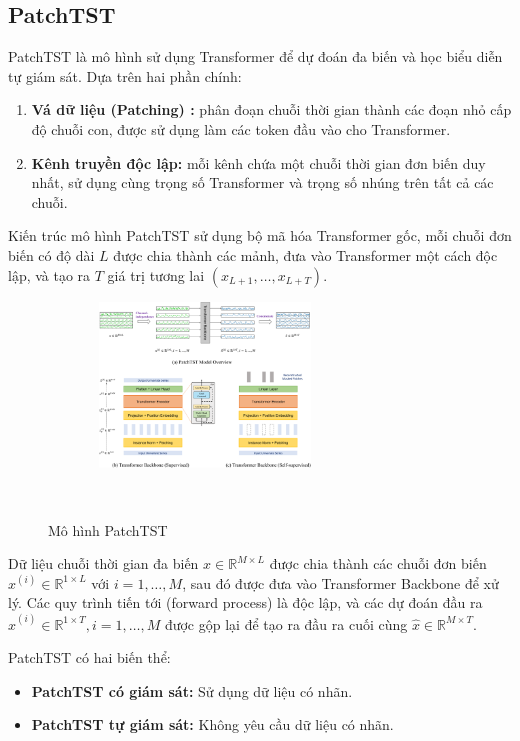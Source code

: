 \documentclass[conference]{IEEEtran}
\begin{document}
\subsection{PatchTST}
PatchTST là mô hình sử dụng Transformer để dự đoán đa biến và học biểu diễn tự giám sát. Dựa trên hai phần chính: \\
\begin{enumerate}
    \item \textbf{Vá dữ liệu (Patching) :} phân đoạn chuỗi thời gian thành các đoạn nhỏ cấp độ chuỗi con, được sử dụng làm các token đầu vào cho Transformer.
    \item \textbf{Kênh truyền độc lập:} mỗi kênh chứa một chuỗi thời gian đơn biến duy nhất, sử dụng cùng trọng số Transformer và trọng số nhúng trên tất cả các chuỗi. 
\end{enumerate}
Kiến trúc mô hình PatchTST sử dụng bộ mã hóa Transformer gốc, mỗi chuỗi đơn biến có độ dài \( L \) được chia thành các mảnh, đưa vào Transformer một cách độc lập, và tạo ra \( T \) giá trị tương lai \( (x_{L+1}, \ldots, x_{L+T}) \).
\begin{figure}[H]
    \centering
    \includegraphics[width=0.5\textwidth]{bibliography/Figure/PatchTSTWorkflow.png}
    \caption{Mô hình PatchTST}
    \label{fig:PatchTST_Model}
\end{figure}
Dữ liệu chuỗi thời gian đa biến \( x \in \mathbb{R}^{M \times L} \) được chia thành các chuỗi đơn biến \( x^{(i)} \in \mathbb{R}^{1 \times L} \) với \( i = 1, \ldots, M \), sau đó được đưa vào Transformer Backbone để xử lý. Các quy trình tiến tới (forward process) là độc lập, và các dự đoán đầu ra \( \hat{x}^{(i)} \in \mathbb{R}^{1 \times T}, i = 1, \ldots, M \) được gộp lại để tạo ra đầu ra cuối cùng \( \hat{x} \in \mathbb{R}^{M \times T} \). 

PatchTST có hai biến thể:
\begin{itemize}
    \item \textbf{PatchTST có giám sát:} Sử dụng dữ liệu có nhãn.
    \item \textbf{PatchTST tự giám sát:} Không yêu cầu dữ liệu có nhãn.
\end{itemize}
\end{document}
